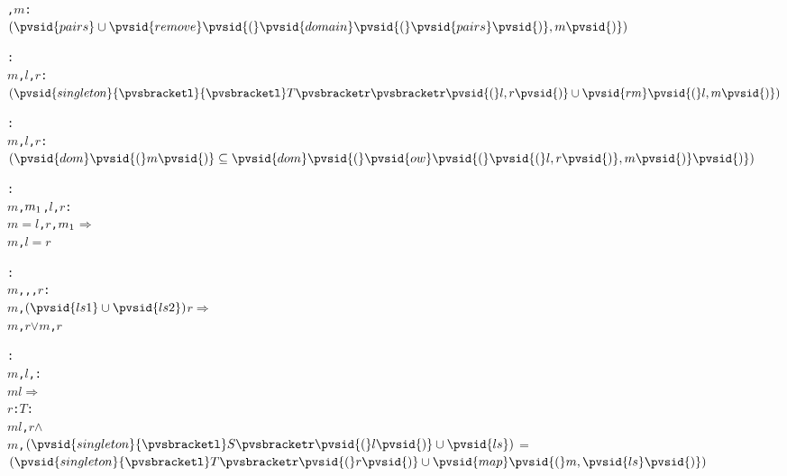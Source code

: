 \begin{alltt}
  \pvsid{(}, \(m\)\pvsid{)}:  \pvskey{=}
      \(\setsotheruniontwofn{\pvsid{pairs}}{\pvsid{remove}\pvsid{(}\pvsid{domain}\pvsid{(}\pvsid{pairs}\pvsid{)}, m\pvsid{)}}\)\vspace*{\pvsdeclspacing}

  : 
     \pvsid{(}\(m\), \(l\), \(r\)\pvsid{)}:
      \pvsid{(}\(\setsotheruniontwofn{\pvsid{singleton}{\pvsbracketl}{\pvsbracketl}T{\pvsbracketr}{\pvsbracketr}\pvsid{(}l, r\pvsid{)}}{\pvsid{rm}\pvsid{(}l, m\pvsid{)}}\)\pvsid{)}\vspace*{\pvsdeclspacing}

  : 
     \pvsid{(}\(m\), \(l\), \(r\)\pvsid{)}: \(\setsothersubsetothertwofn{\pvsid{dom}\pvsid{(}m\pvsid{)}}{\pvsid{dom}\pvsid{(}\pvsid{ow}\pvsid{(}\pvsid{(}l, r\pvsid{)}, m\pvsid{)}\pvsid{)}}\)\vspace*{\pvsdeclspacing}

  : 
     \pvsid{(}\(m\), \(m\sb{1}\), \(l\), \(r\)\pvsid{)}:
      \(m\) \(=\) \pvsid{(}\pvsid{(}\(l\), \(r\)\pvsid{)}, \(m\sb{1}\)\pvsid{)} \(\Rightarrow\)
       \pvsid{(}\(m\), \pvsid{(}\(l\)\pvsid{)}\pvsid{)} \(=\) \pvsid{(}\(r\)\pvsid{)}\vspace*{\pvsdeclspacing}

  : 
     \pvsid{(}\(m\), , , \(r\)\pvsid{)}:
      \pvsid{(}\(m\), \(\setsotheruniontwofn{\pvsid{ls1}}{\pvsid{ls2}}\)\pvsid{)}\pvsid{(}\(r\)\pvsid{)} \(\Rightarrow\)
       \pvsid{(}\(m\), \pvsid{)}\pvsid{(}\(r\)\pvsid{)} \(\vee\) \pvsid{(}\(m\), \pvsid{)}\pvsid{(}\(r\)\pvsid{)}\vspace*{\pvsdeclspacing}

  : 
     \pvsid{(}\(m\), \(l\), \pvsid{)}:
      \pvsid{(}\(m\)\pvsid{)}\pvsid{(}\(l\)\pvsid{)} \(\Rightarrow\)
       \pvsid{(} \pvsid{(}\(r\): \(T\)\pvsid{)}:
           \(m\)\pvsid{(}\(l\), \(r\)\pvsid{)} \(\wedge\)
            \pvsid{(}\(m\), \(\setsotheruniontwofn{\pvsid{singleton}{\pvsbracketl}S{\pvsbracketr}\pvsid{(}l\pvsid{)}}{\pvsid{ls}}\)\pvsid{)} \(=\)
             \(\setsotheruniontwofn{\pvsid{singleton}{\pvsbracketl}T{\pvsbracketr}\pvsid{(}r\pvsid{)}}{\pvsid{map}\pvsid{(}m, \pvsid{ls}\pvsid{)}}\)\pvsid{)}\vspace*{\pvsdeclspacing}


\end{alltt}
